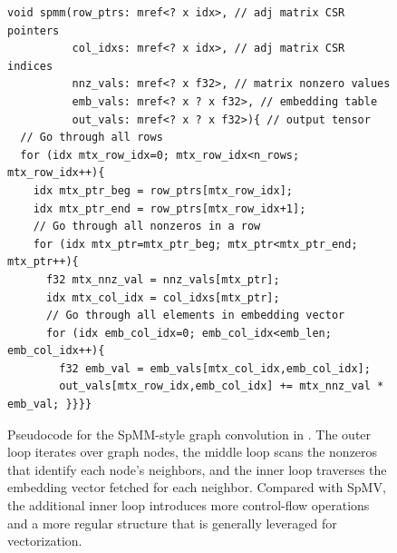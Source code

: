 \begin{figure}
    \begin{lstlisting}[]
void spmm(row_ptrs: mref<? x idx>, // adj matrix CSR pointers
          col_idxs: mref<? x idx>, // adj matrix CSR indices
          nnz_vals: mref<? x f32>, // matrix nonzero values
          emb_vals: mref<? x ? x f32>, // embedding table
          out_vals: mref<? x ? x f32>){ // output tensor
  // Go through all rows
  for (idx mtx_row_idx=0; mtx_row_idx<n_rows; mtx_row_idx++){
    idx mtx_ptr_beg = row_ptrs[mtx_row_idx];
    idx mtx_ptr_end = row_ptrs[mtx_row_idx+1];
    // Go through all nonzeros in a row
    for (idx mtx_ptr=mtx_ptr_beg; mtx_ptr<mtx_ptr_end; mtx_ptr++){
      f32 mtx_nnz_val = nnz_vals[mtx_ptr];
      idx mtx_col_idx = col_idxs[mtx_ptr];
      // Go through all elements in embedding vector
      for (idx emb_col_idx=0; emb_col_idx<emb_len; emb_col_idx++){
        f32 emb_val = emb_vals[mtx_col_idx,emb_col_idx];
        out_vals[mtx_row_idx,emb_col_idx] += mtx_nnz_val * emb_val; }}}}
    \end{lstlisting}
    \vspace{-1em}
    \caption[Pseudocode of graph convolution.]{Pseudocode for the SpMM-style graph convolution in . The outer loop iterates over graph nodes, the middle loop scans the nonzeros that identify each node's neighbors, and the inner loop traverses the embedding vector fetched for each neighbor. Compared with SpMV, the additional inner loop introduces more control-flow operations and a more regular structure that is generally leveraged for vectorization.} %
    \label{fig:background-gnn-graph-convolution-pseudocode}
\end{figure}
